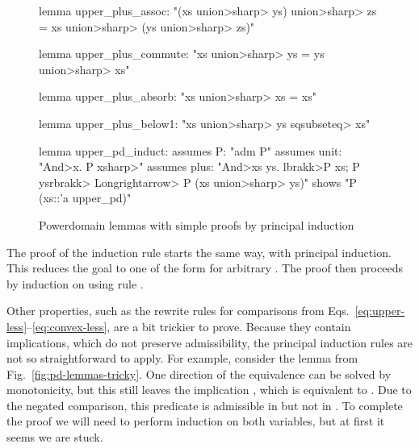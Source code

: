 \begin{figure}
\begin{isacode}
lemma upper_plus_assoc: "(xs \<union>\<sharp> ys) \<union>\<sharp> zs = xs \<union>\<sharp> (ys \<union>\<sharp> zs)"
\end{isacode}
\unmedskip
{}
\begin{isacode}
lemma upper_plus_commute: "xs \<union>\<sharp> ys = ys \<union>\<sharp> xs"
\end{isacode}
\unmedskip
{}
\begin{isacode}
lemma upper_plus_absorb: "xs \<union>\<sharp> xs = xs"
\end{isacode}
\unmedskip
{}
\begin{isacode}
lemma upper_plus_below1: "xs \<union>\<sharp> ys \<sqsubseteq> xs"
\end{isacode}
\unmedskip
{}
\begin{isacode}
lemma upper_pd_induct:
  assumes P: "adm P"
  assumes unit: "\<And>x. P {x}\<sharp>"
  assumes plus: "\<And>xs ys. \<lbrakk>P xs; P ys\<rbrakk> \<Longrightarrow> P (xs \<union>\<sharp> ys)"
  shows "P (xs::'a upper_pd)"
\end{isacode}
\caption{Powerdomain lemmas with simple proofs by principal induction}
\label{fig:pd-lemmas-easy}
\end{figure}

The proof of the induction rule  starts the same way, with principal induction. This reduces the goal  to one of the form  for arbitrary . The proof then proceeds by induction on  using rule .

Other properties, such as the rewrite rules for comparisons from Eqs.~\eqref{eq:upper-less}--\eqref{eq:convex-less}, are a bit trickier to prove. Because they contain implications, which do not preserve admissibility, the principal induction rules are not so straightforward to apply. For example, consider the lemma  from Fig.~\ref{fig:pd-lemmas-tricky}. One direction of the equivalence can be solved by monotonicity, but this still leaves the implication , which is equivalent to . Due to the negated comparison, this predicate is admissible in  but not in . To complete the proof we will need to perform induction on both variables, but at first it seems we are stuck.

